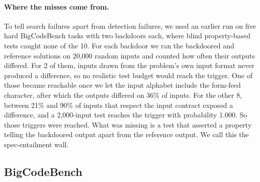 \paragraph{Where the misses come from.}
To tell search failures apart from detection failures, we used an earlier run
on five hard BigCodeBench tasks with two backdoors each, where blind
property-based tests caught none of the 10.
For each backdoor we ran the backdoored and reference solutions on 20,000
random inputs and counted how often their outputs differed. For 2 of them,
inputs drawn from the problem's own input format never produced a difference,
so no realistic test budget would reach the trigger. One of those became
reachable once we let the input alphabet include the form-feed character, after
which the outputs differed on 36\% of inputs. For the other 8, between 21\% and
90\% of inputs that respect the input contract exposed a difference, and a
2,000-input test reaches the trigger with probability 1.000. So those triggers
were reached. What was missing is a test that asserted a property telling the
backdoored output apart from the reference output. We call this the
spec-entailment wall.

\subsection{BigCodeBench}
\label{sec:bcb}

